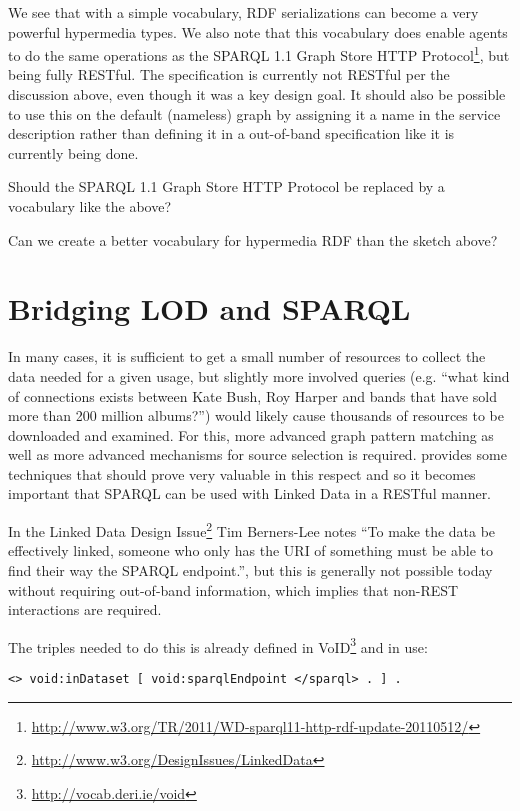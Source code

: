 \documentclass{llncs}
\begin{document}
We see that with a simple vocabulary, RDF serializations can become a
very powerful hypermedia types. We also note that this vocabulary does
enable agents to do the same operations as the SPARQL 1.1 Graph Store
HTTP
Protocol\footnote{\url{http://www.w3.org/TR/2011/WD-sparql11-http-rdf-update-20110512/}},
but being fully RESTful. The specification is currently not RESTful
per the discussion above, even though it was a key design goal. It
should also be possible to use this on the default (nameless) graph by
assigning it a name in the service description rather than defining it
in a out-of-band specification like it is currently being done.

\begin{question}
Should the SPARQL 1.1 Graph Store HTTP Protocol be replaced by a
vocabulary like the above?
\end{question}

\begin{question}
Can we create a better vocabulary for hypermedia RDF than the sketch above?
\end{question}

\section{Bridging LOD and SPARQL}

In many cases, it is sufficient to get a small number of resources to
collect the data needed for a given usage, but slightly more involved
queries (e.g. ``what kind of connections exists between Kate Bush, Roy
Harper and bands that have sold more than 200 million albums?'') would
likely cause thousands of resources to be downloaded and examined. For
this, more advanced graph pattern matching as well as more advanced
mechanisms for source selection is
required. \cite{springerlink:10.1007/978-3-642-25073-6-38} provides
some techniques that should prove very valuable in this respect and so
it becomes important that SPARQL can be used with Linked Data in a
RESTful manner.

In the Linked Data Design
Issue\footnote{\url{http://www.w3.org/DesignIssues/LinkedData}} Tim
Berners-Lee notes ``To make the data be effectively linked, someone
who only has the URI of something must be able to find their way the
SPARQL endpoint.'', but this is generally not possible today without
requiring out-of-band information, which implies that non-REST
interactions are required. 

The triples needed to do this is already defined in
VoID\footnote{\url{http://vocab.deri.ie/void}} and in use:
\begin{verbatim}
<> void:inDataset [ void:sparqlEndpoint </sparql> . ] .
\end{verbatim}
\end{document}
